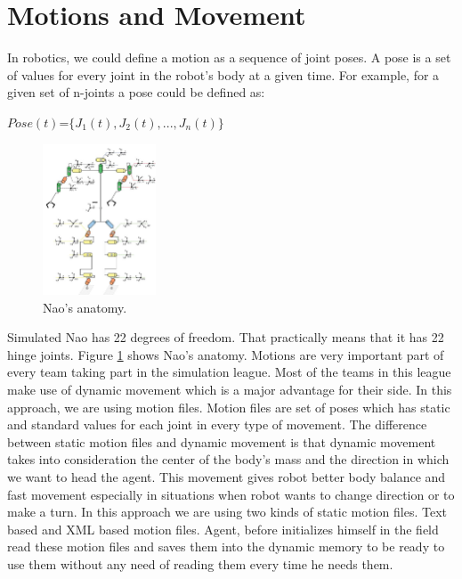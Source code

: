 \section{Motions and Movement}
\label{Motions}
In robotics, we could define a motion as a sequence of joint poses. A pose is a set of values for every joint in the robot's body at a given time.
For example, for a given set of n-joints a pose could be defined as:\\
\begin{center}
$Pose(t)$=$\lbrace J_{1}(t),J_{2}(t),...,J_{n}(t) \rbrace$\\
\end{center}
\begin{figure}[htb!]
\centering
  \includegraphics[width=0.3\textwidth]{Chapter3/figures/Models_NaoAnatomy.png}
  \caption{Nao's anatomy.}
  \label{fig:NaoAnatomy}
\end{figure}
Simulated Nao has 22 degrees of freedom. That practically means that it has 22 hinge joints.
Figure \ref{fig:NaoAnatomy} shows Nao's anatomy.
Motions are very important part of every team taking part in the simulation league. Most of the teams in this league make use of dynamic movement which is a major advantage for their side. In this approach, we are using motion files. Motion files are set of poses which has static and standard values for each joint in every type of movement. The difference between static motion files and dynamic movement is that dynamic movement takes into consideration the center of the body's mass and the direction in which we want to head the agent. This movement gives robot better body balance and fast movement especially in situations when robot wants to change direction or to make a turn. In this approach we are using two kinds of static motion files. Text based and XML based motion files. Agent, before initializes himself in the field read these motion files and saves them into the dynamic memory to be ready to use them without any need of reading them every time he needs them.



